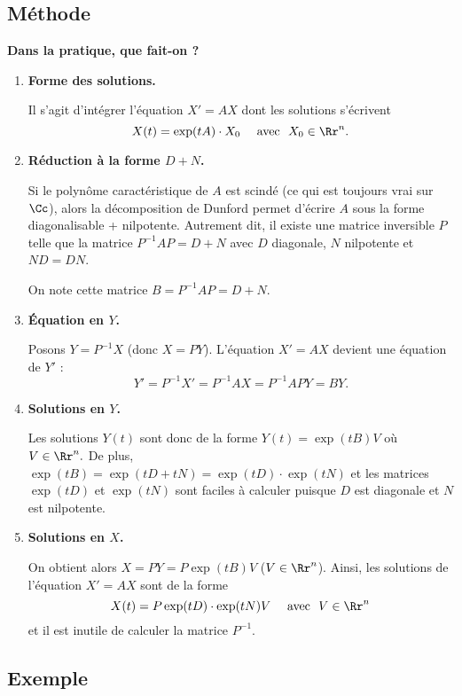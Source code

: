 \documentclass[12pt, class=report,crop=false]{standalone}
\begin{document}
\subsection{Méthode}


\textbf{Dans la pratique, que fait-on ?}

\begin{enumerate}
  \item \textbf{Forme des solutions.} 
  
  Il s'agit d'intégrer l'équation $X'=AX$ dont les solutions 
  s'écrivent 
  $$X(t)=\exp(tA) \cdot X_0 \quad \text{ avec } \  X_0\in\Rr^n.$$
  
  \item \textbf{Réduction à la forme $D + N$.} 
  
  Si le polynôme caractéristique de $A$ est scindé (ce qui est toujours vrai sur $\Cc$), alors la décomposition de Dunford permet d'écrire $A$ sous la forme  \og{}diagonalisable + nilpotente\fg{}. Autrement dit, il existe une matrice inversible $P$ telle que la matrice $P^{-1}AP=D+N$ avec $D$ diagonale, $N$ nilpotente et $ND=DN$.
  
  On note cette matrice $B = P^{-1}AP=D+N$.
  
  
  \item \textbf{\'Equation en $Y$.} 
  
  Posons $Y = P^{-1}X$ (donc $X=PY$). 
  L'équation $X'=AX$ devient une équation de $Y'$ :
  $$Y' = P^{-1}X'= P^{-1}AX = P^{-1}AP Y = BY.$$
  
  \item \textbf{Solutions en $Y$.}  
  
  Les solutions $Y(t)$ sont donc de la forme $Y(t)=\exp(tB)V$ où $V\in\Rr^n.$
  De plus, $\exp(tB)=\exp(tD+tN)=\exp(tD)\cdot\exp(tN)$ et les matrices $\exp(tD)$ et $\exp(tN)$ sont faciles à calculer puisque $D$ est diagonale et $N$ est nilpotente.
  
  \item \textbf{Solutions en $X$.}
  
  On obtient alors $X = PY=P\exp(tB)V$ ($V\in\Rr^n$).
  Ainsi, les solutions de l'équation $X'=AX$ sont de la forme
$$X(t)=P\exp(tD)\cdot\exp(tN)V \quad \text{ avec }\  V\in\Rr^n$$
et il est inutile de calculer la matrice $P^{-1}$.
   
\end{enumerate}

\subsection{Exemple}
\end{document}
